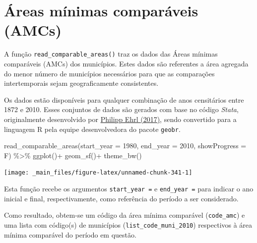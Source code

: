 \documentclass[
  brazilian,
]{book}
\newenvironment{Shaded}{\begin{snugshade}}{\end{snugshade}}
\newcommand{\AttributeTok}[1]{\textcolor[rgb]{0.77,0.63,0.00}{#1}}
\newcommand{\DecValTok}[1]{\textcolor[rgb]{0.00,0.00,0.81}{#1}}
\newcommand{\FunctionTok}[1]{\textcolor[rgb]{0.00,0.00,0.00}{#1}}
\newcommand{\NormalTok}[1]{#1}
\newcommand{\SpecialCharTok}[1]{\textcolor[rgb]{0.00,0.00,0.00}{#1}}
\begin{document}
\hypertarget{uxe1reas-muxednimas-comparuxe1veis-amcs}{%
\section{Áreas mínimas comparáveis (AMCs)}\label{uxe1reas-muxednimas-comparuxe1veis-amcs}}

A função \texttt{read\_comparable\_areas()} traz os dados das Áreas mínimas comparáveis (AMCs) dos municípios. Estes dados são referentes a área agregada do menor número de municípios necessários para que as comparações intertemporais sejam geograficamente consistentes.

Os dados estão disponíveis para qualquer combinação de anos censitários entre 1872 e 2010. Esses conjuntos de dados são gerados com base no código \emph{Stata}, originalmente desenvolvido por \href{https://www.scielo.br/j/ee/a/d87GfsmvZGhsjTQPLpb8hBJ/?lang=en}{Philipp Ehrl (2017)}, sendo convertido para a linguagem R pela equipe desenvolvedora do pacote \texttt{geobr}.

\begin{Shaded}
\begin{Highlighting}[]
\FunctionTok{read\_comparable\_areas}\NormalTok{(}\AttributeTok{start\_year =} \DecValTok{1980}\NormalTok{,}
                      \AttributeTok{end\_year =} \DecValTok{2010}\NormalTok{,}
                      \AttributeTok{showProgress =}\NormalTok{ F) }\SpecialCharTok{\%\textgreater{}\%} 
  \FunctionTok{ggplot}\NormalTok{()}\SpecialCharTok{+}
  \FunctionTok{geom\_sf}\NormalTok{()}\SpecialCharTok{+}
  \FunctionTok{theme\_bw}\NormalTok{()}
\end{Highlighting}
\end{Shaded}

\begin{center}\texttt{[image: \_main\_files/figure-latex/unnamed-chunk-341-1]} \end{center}

Esta função recebe os argumentos \texttt{start\_year\ =} e \texttt{end\_year\ =} para indicar o ano inicial e final, respectivamente, como referência do período a ser considerado.

Como resultado, obtem-se um código da área mínima comparável (\texttt{code\_amc}) e uma lista com código(s) de municípios (\texttt{list\_code\_muni\_2010}) respectivos à área mínima comparável do período em questão.
\end{document}
